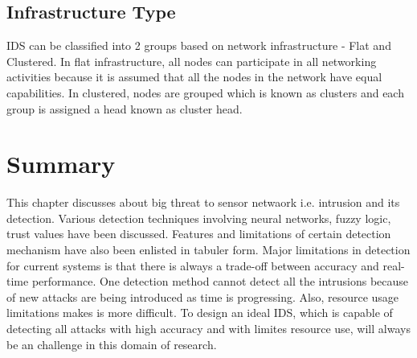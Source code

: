 \subsection{Infrastructure Type}
IDS can be classified into 2 groups based on network infrastructure - Flat and Clustered. In flat infrastructure, all nodes can participate in all networking activities because it is assumed that all the nodes in the network have equal capabilities. In clustered, nodes are grouped which is known as clusters and each group is assigned a head known as cluster head.

\section{Summary}
This chapter discusses about big threat to sensor netwaork i.e. intrusion and its detection. Various detection techniques involving neural networks, fuzzy logic, trust values have been discussed. Features and limitations of certain detection mechanism have also been enlisted in tabuler form. Major limitations in detection for current systems is that there is always a trade-off between accuracy and real-time performance. One detection method cannot detect all the intrusions because of new attacks are being introduced as time is progressing. Also, resource usage limitations makes is more difficult. To design an ideal IDS, which is capable of detecting all attacks with high accuracy and with limites resource use, will always be an challenge in this domain of research.